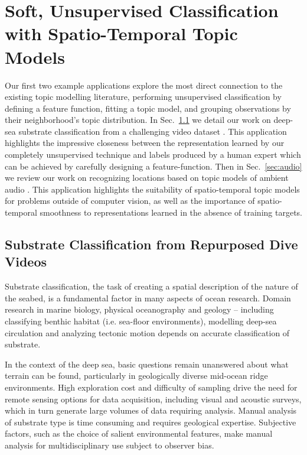 
\chapter{Soft, Unsupervised Classification with Spatio-Temporal Topic Models} \label{ch:topic-models-examples}
Our first two example applications explore the most direct connection to the existing topic modelling literature, performing unsupervised classification by defining a feature function, fitting a topic model, and grouping observations by their neighborhood's topic distribution. In Sec.~\ref{sec:substrate} we detail our work on deep-sea substrate classification from a challenging video dataset \citep{Kalmbach2016}. This application highlights the impressive closeness between the representation learned by our completely unsupervised technique and labels produced by a human expert which can be achieved by carefully designing a feature-function. Then in Sec.~\ref{sec:audio} we review our work on recognizing locations based on topic models of ambient audio \citep{Kalmbach2013}. This application highlights the suitability of spatio-temporal topic models for problems outside of computer vision, as well as the importance of spatio-temporal smoothness to representations learned in the absence of training targets.

\section{Substrate Classification from Repurposed Dive Videos} \label{sec:substrate}

Substrate classification, the task of creating a spatial description of the nature of the seabed, is a fundamental factor in many aspects of ocean research.
Domain research in marine biology, physical oceanography and geology -- including classifying benthic habitat (i.e. sea-floor environments), modelling deep-sea circulation and analyzing tectonic motion depends on accurate classification of substrate.

In the context of the deep sea, basic questions remain unanswered about what terrain can be found, particularly in geologically diverse mid-ocean ridge environments. High exploration cost and difficulty of sampling drive the need for remote sensing options for data acquisition, including visual and acoustic surveys, which in turn generate large volumes of data requiring analysis.
Manual analysis of substrate type is time consuming and requires geological expertise. Subjective factors, such as the choice of salient environmental features, make manual analysis for multidisciplinary use subject to observer bias.

